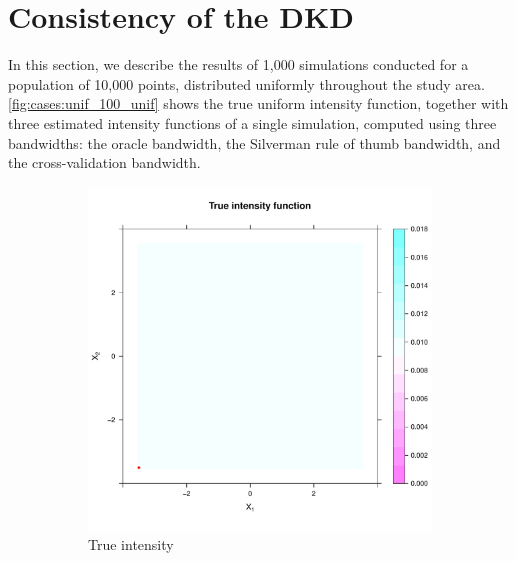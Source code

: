 \section{Consistency of the DKD}
\label{sec:results:consistency}


In this section, we describe the results of 1,000 simulations conducted for a population of 10,000 points,
distributed uniformly throughout the study area.
\autoref{fig:cases:unif_100_unif} shows the true uniform intensity function,
together with three estimated intensity functions of a single simulation,
computed using three bandwidths: the oracle bandwidth, the Silverman rule of thumb bandwidth,
and the cross-validation bandwidth.

\begin{figure}[htbp]
    \centering
    \begin{subfigure}[t]{0.45\textwidth}
    \includegraphics[width=\textwidth]{results/unif_100_unif/output/true_intensity_heatmap}
    \caption{True intensity}
    \end{subfigure}%
    \begin{subfigure}[t]{0.45\textwidth}

\end{subfigure}
\end{figure}
